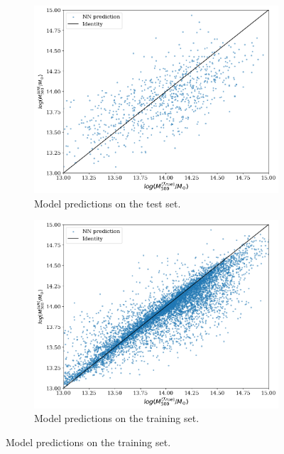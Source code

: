 \begin{figure}[H]
\centering
\begin{subfigure}{.46\textwidth}
  \centering
  \includegraphics[width=\linewidth]{images/Chapter4/Res101/res101_test.png}
  \caption{Model predictions on the test set.}
  \label{fig:best_perf_resnet101_a}
\end{subfigure}%
\hspace{.6em}
\begin{subfigure}{.46\textwidth}
  \centering
  \includegraphics[width=\linewidth]{images/Chapter4/Res101/res101_train.png}
  \caption{Model predictions on the training set.}
  \label{fig:best_perf_resnet101_b}
\end{subfigure}

\end{figure}
